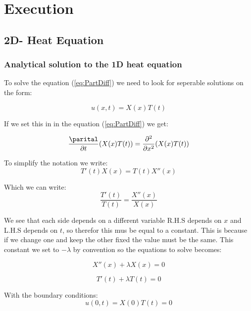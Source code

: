 \documentclass[a4paper,10pt]{article}
\begin{document}
\section{Execution}
\subsection{2D- Heat Equation}
\subsubsection{Analytical solution to the 1D heat equation}
To solve the equation (\ref{eq:PartDiff}) we need to look for seperable solutions on the form:

\begin{equation}
 u(x,t) = X(x)T(t)
 \label{eq:u_xt}
\end{equation}

If we set this in in the equation (\ref{eq:PartDiff}) we get:

\begin{equation}
 
 \frac{\parital}{\partial t}(X(x)T(t)) = \frac{\partial ^2}{\partial x^2}(X(x)T(t))
\end{equation}

To simplify the notation we write:
\begin{equation}
 T'(t)X(x) = T(t)X''(x)
\end{equation}

Which we can write:
\begin{equation}
 \frac{T'(t)}{T(t)} = \frac{X''(x)}{X(x)}
\end{equation}

We see that each side depends on a different variable R.H.S depends on $x$ and L.H.S depends on $t$, so therefor this mus be equal to a constant.
This is because if we change one and keep the other fixed the value must be the same. This constant we set to $-\lambda$ by convention so the equations
to solve becomes:

\begin{equation}
 X''(x) + \lambda X(x) = 0
\end{equation}

\begin{equation}
 T'(t) + \lambda T(t) = 0
\end{equation}

With the boundary conditions:
\begin{equation}
 u(0,t) = X(0)T(t) = 0
\end{equation}
\end{document}

